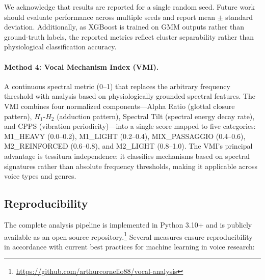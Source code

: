 \documentclass[review,3p,number]{elsarticle}
\begin{document}
We acknowledge that results are reported for a single random seed. Future work
should evaluate performance across multiple seeds and report mean $\pm$ standard
deviation. Additionally, as XGBoost is
trained on GMM outputs rather than ground-truth labels, the reported metrics reflect
cluster separability rather than physiological classification accuracy.

\paragraph{Method 4: Vocal Mechanism Index (VMI).}
A continuous spectral metric (0--1) that replaces the arbitrary frequency threshold
with analysis based on physiologically grounded spectral features. The VMI combines
four normalized components---Alpha Ratio (glottal closure pattern), $H_1$-$H_2$ (adduction
pattern), Spectral Tilt (spectral energy decay rate), and CPPS (vibration
periodicity)---into a single score mapped to five categories: M1\_HEAVY (0.0--0.2),
M1\_LIGHT (0.2--0.4), MIX\_PASSAGGIO (0.4--0.6), M2\_REINFORCED (0.6--0.8), and
M2\_LIGHT (0.8--1.0). The VMI's principal advantage is tessitura independence: it
classifies mechanisms based on spectral signatures rather than absolute frequency
thresholds, making it applicable across voice types and genres.

\subsection{Reproducibility}
\label{sec:reproducibility}

The complete analysis pipeline is implemented in Python 3.10+ and is publicly
available as an open-source repository.\footnote{\url{https://github.com/arthurcornelio88/vocal-analysis}} Several measures ensure reproducibility in
accordance with current best practices for machine learning in voice
research:
\end{document}
